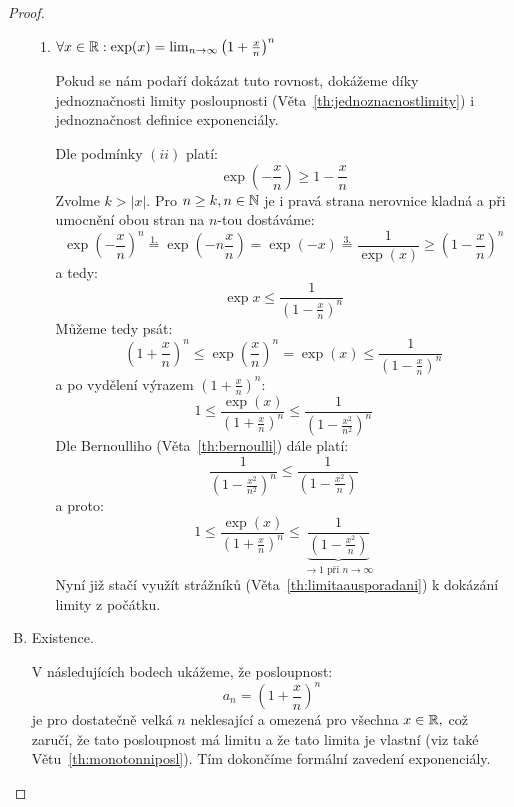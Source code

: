 \begin{proof}
\begin{enumerate}[A.]
\begin{enumerate}[1.]
                \item $\forall x \in \mathbb{R}: \exp(x) = \lim_{n\to\infty} 
                    \left(1 + \frac{x}{n}\right)^n$

                    Pokud se nám podaří dokázat tuto rovnost, dokážeme
                    díky jednoznačnosti limity posloupnosti (Věta~\ref{th:jednoznacnostlimity})
                    i jednoznačnost definice exponenciály.

                    Dle podmínky $(ii)$ platí:
                    $$\exp\left(-\frac{x}{n}\right) \geq 1 - \frac{x}{n}$$
                    Zvolme $k > |x|.$ Pro $n \geq k, n \in \mathbb{N}$ je i pravá strana 
                    nerovnice kladná a při umocnění obou stran na $n$-tou dostáváme:
                    $$\exp\left(-\frac{x}{n}\right)^n \stackrel{1.}{=} 
                    \exp\left(-n\frac{x}{n}\right) = \exp(-x) 
                        \stackrel{3.}{=} \frac{1}{\exp(x)}
                        \geq \left(1-\frac{x}{n}\right)^n$$
                    a tedy:
                    $$\exp{x} \leq \frac{1}{\left(1 - \frac{x}{n}\right)^n}$$
                    Můžeme tedy psát:
                    $$\left(1 + \frac{x}{n}\right)^n \leq \exp\left(\frac{x}{n}\right)^n
                    = \exp(x) \leq \frac{1}{\left(1 - \frac{x}{n}\right)^n}$$
                    a po vydělení výrazem $\left(1 + \frac{x}{n}\right)^n$:
                    $$1 \leq \frac{\exp(x)}{\left(1 + \frac{x}{n}\right)^n} 
                    \leq \frac{1}{\left(1 - \frac{x^2}{n^2}\right)^n}$$
                    Dle Bernoulliho (Věta~\ref{th:bernoulli}) dále platí:
                    $$\frac{1}{\left(1 - \frac{x^2}{n^2}\right)^n} \leq
                    \frac{1}{\left(1 - \frac{x^2}{n}\right)}$$
                    a proto:
                    $$1 \leq \frac{\exp(x)}{\left(1 + \frac{x}{n}\right)^n} 
                    \leq \underbrace{\frac{1}{\left(1 - \frac{x^2}{n}\right)}}_{\to 1 \text{ při } n \to \infty}$$
                    Nyní již stačí využít strážníků (Věta~\ref{th:limitaausporadani})
                    k dokázání limity z počátku.             
            \end{enumerate}

        \item Existence. 

            V následujících bodech ukážeme, že posloupnost:
                $$a_n = \left(1 + \frac{x}{n}\right)^n$$
            je pro dostatečně velká $n$ neklesající a omezená pro všechna $x \in \mathbb{R},$
            což zaručí, že tato posloupnost má limitu a že tato limita je vlastní
            (viz také Větu~\ref{th:monotonniposl}). 
            Tím dokončíme formální zavedení exponenciály.


\end{enumerate}
\end{proof}
